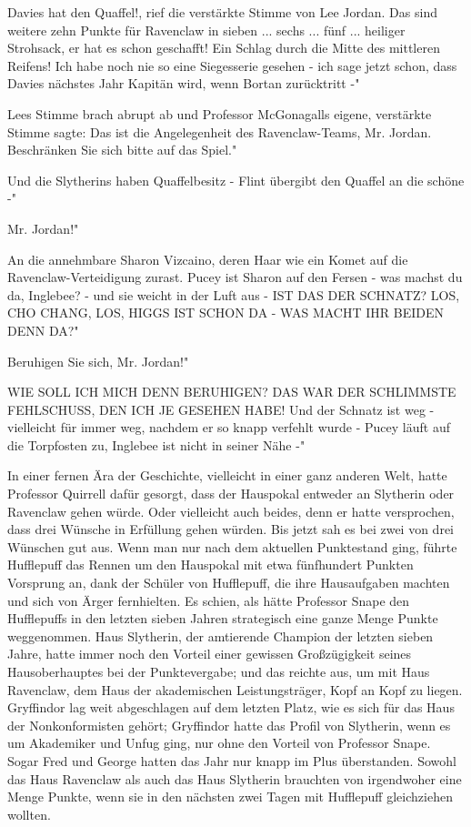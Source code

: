 \glqq Davies hat den Quaffel!\grqq{}, rief die verstärkte Stimme von Lee Jordan.
\glqq Das sind weitere zehn Punkte für Ravenclaw in sieben ... sechs ... fünf
... heiliger Strohsack, er hat es schon geschafft! Ein Schlag durch die Mitte
des mittleren Reifens! Ich habe noch nie so eine Siegesserie gesehen - ich sage
jetzt schon, dass Davies nächstes Jahr Kapitän wird, wenn Bortan zurücktritt -"

Lees Stimme brach abrupt ab und Professor McGonagalls eigene, verstärkte Stimme
sagte: \glqq Das ist die Angelegenheit des Ravenclaw-Teams, Mr. Jordan.
Beschränken Sie sich bitte auf das Spiel."

\glqq Und die Slytherins haben Quaffelbesitz - Flint übergibt den Quaffel an die
schöne -"

\glqq Mr. Jordan!"

\glqq An die annehmbare Sharon Vizcaino, deren Haar wie ein Komet auf die
Ravenclaw-Verteidigung zurast. Pucey ist Sharon auf den Fersen - was machst du
da, Inglebee? - und sie weicht in der Luft aus - IST DAS DER SCHNATZ? LOS, CHO
CHANG, LOS, HIGGS IST SCHON DA - WAS MACHT IHR BEIDEN DENN DA?"

\glqq Beruhigen Sie sich, Mr. Jordan!"

\glqq WIE SOLL ICH MICH DENN BERUHIGEN? DAS WAR DER SCHLIMMSTE FEHLSCHUSS, DEN
ICH JE GESEHEN HABE! Und der Schnatz ist weg - vielleicht für immer weg, nachdem
er so knapp verfehlt wurde - Pucey läuft auf die Torpfosten zu, Inglebee ist
nicht in seiner Nähe -"

In einer fernen Ära der Geschichte, vielleicht in einer ganz anderen Welt, hatte
Professor Quirrell dafür gesorgt, dass der Hauspokal entweder an Slytherin oder
Ravenclaw gehen würde. Oder vielleicht auch beides, denn er hatte versprochen,
dass drei Wünsche in Erfüllung gehen würden. Bis jetzt sah es bei zwei von drei
Wünschen gut aus. Wenn man nur nach dem aktuellen Punktestand ging, führte
Hufflepuff das Rennen um den Hauspokal mit etwa fünfhundert Punkten Vorsprung
an, dank der Schüler von Hufflepuff, die ihre Hausaufgaben machten und sich von
Ärger fernhielten. Es schien, als hätte Professor Snape den Hufflepuffs in den
letzten sieben Jahren strategisch eine ganze Menge Punkte weggenommen. Haus
Slytherin, der amtierende Champion der letzten sieben Jahre, hatte immer noch
den Vorteil einer gewissen Großzügigkeit seines Hausoberhauptes bei der
Punktevergabe; und das reichte aus, um mit Haus Ravenclaw, dem Haus der
akademischen Leistungsträger, Kopf an Kopf zu liegen. Gryffindor lag weit
abgeschlagen auf dem letzten Platz, wie es sich für das Haus der Nonkonformisten
gehört; Gryffindor hatte das Profil von Slytherin, wenn es um Akademiker und
Unfug ging, nur ohne den Vorteil von Professor Snape. Sogar Fred und George
hatten das Jahr nur knapp im Plus überstanden. Sowohl das Haus Ravenclaw als
auch das Haus Slytherin brauchten von irgendwoher eine Menge Punkte, wenn sie in
den nächsten zwei Tagen mit Hufflepuff gleichziehen wollten.

